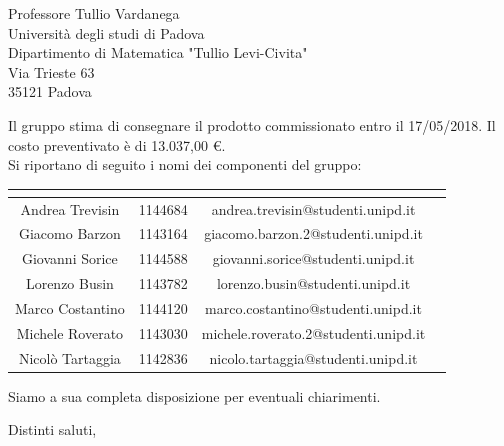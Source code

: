 \begin{letter}{Professore Tullio Vardanega \\ Università degli studi di Padova \\ Dipartimento di Matematica "Tullio Levi-Civita" \\ Via Trieste 63 \\ 35121 Padova}
\begin{addmargin}[2em]{2em}
  Il gruppo stima di consegnare il prodotto commissionato entro il 17/05/2018. Il costo preventivato è di 13.037,00 \euro.\\
  
  Si riportano di seguito i nomi dei componenti del gruppo:
\renewcommand{\arraystretch}{2}
	\begin{center}
		\begin{tabular}{| c | c | c | p{3cm} |}
			\hline
			\rowcolor{title_row}
			\textbf{\color{title_text}{Nominativo}} & \textbf{\color{title_text}{Matricola}} & \textbf{\color{title_text}{Email}} \\ \hline
			Andrea Trevisin & 1144684 & andrea.trevisin@studenti.unipd.it \\ \hline
			Giacomo Barzon & 1143164 & giacomo.barzon.2@studenti.unipd.it \\ \hline
			Giovanni Sorice & 1144588 & giovanni.sorice@studenti.unipd.it \\ \hline
			Lorenzo Busin & 1143782 & lorenzo.busin@studenti.unipd.it \\ \hline
			Marco Costantino & 1144120 & marco.costantino@studenti.unipd.it \\ \hline
			Michele Roverato & 1143030 & michele.roverato.2@studenti.unipd.it \\ \hline
			Nicolò Tartaggia & 1142836 & nicolo.tartaggia@studenti.unipd.it \\ 
			\hline
		\end{tabular}
	\end{center}
\renewcommand{\arraystretch}{1}

Siamo a sua completa disposizione per eventuali chiarimenti.
\end{addmargin}

\closing{Distinti saluti,}




\end{letter}
 

